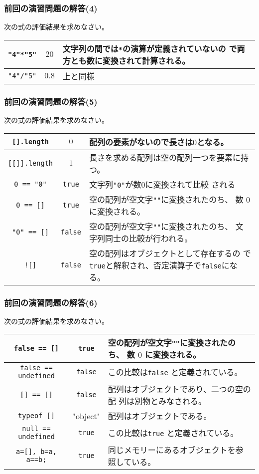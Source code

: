 \begin{frame}[containsverbatim]
\frametitle{前回の演習問題の解答(4)}
次の式の評価結果を求めなさい。
\begin{center}
 \begin{tabular}{|>{\Rule}c|c|m{}|}\hline
  \Verb+"4"*"5"+& $20$& 文字列の間では\Verb+*+の演算が定義されていないの
    で両方とも数に変換されて計算される。\\ \hline
  \Verb+"4"/"5"+& $0.8$& 上と同様\\ \hline
 \end{tabular}
\end{center}
\end{frame}
\begin{frame}[containsverbatim]
\frametitle{前回の演習問題の解答(5)}
次の式の評価結果を求めなさい。
\begin{center}
 \begin{tabular}{|>{\Rule}c|c|m{}|}\hline
  \Verb+[].length+& $0$& 配列の要素がないので長さは$0$となる。\\ \hline
  \Verb+[[]].length+&$1$ & 長さを求める配列は空の配列一つを要素に持つ。\\ \hline
  \Verb+0 == "0"+& \Verb+true+& 文字列\Verb+"0"+が数$0$に変換されて比較
    される\\ \hline
  \Verb+0 == []+& \Verb+true+& 空の配列が空文字\texttt{""}に変換されたのち、
    数 $0$ に変換される。\\ \hline
  \Verb+"0" == []+& \Verb+false+& 空の配列が空文字\texttt{""}に変換されたのち、
    文字列同士の比較が行われる。\\ \hline
  \Verb+![]+& \Verb+false+& 空の配列はオブジェクトとして存在するの
          で\texttt{true}と解釈され、否定演算子で\texttt{false}になる。
          \\ \hline
 \end{tabular}
\end{center}
\end{frame}
\begin{frame}[containsverbatim]
\frametitle{前回の演習問題の解答(6)}
次の式の評価結果を求めなさい。
\begin{center}
 \begin{tabular}{|>{\Rule}c|c|m{}|}\hline
  \Verb+false == []+& \Verb+true+& 空の配列が空文字\texttt{""}に変換されたのち、
    数 $0$ に変換される。\\ \hline
  \Verb+false == undefined+& \texttt{false}&この比較は\texttt{false}
  と定義されている。\\ \hline
  \Verb+[] == []+& \Verb+false+& 配列はオブジェクトであり、二つの空の配
    列は別物とみなされる。\\ \hline
  \Verb+typeof []+& "object"& 配列はオブジェクトである。\\ \hline
  \Verb+null == undefined+& \Verb+true+ & この比較は\texttt{true}
  と定義されている。\\ \hline
  \Verb+a=[], b=a, a==b;+&\Verb+true+&同じメモリーにあるオブジェクトを参
    照している。\\ \hline
 \end{tabular}
\end{center}
\end{frame}
